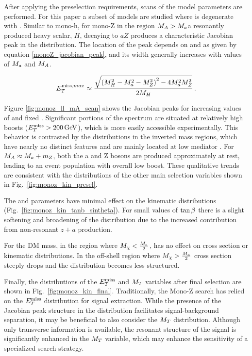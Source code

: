After applying the preselection requirements, scans of the model parameters are performed.  For this paper a subset of models are studied where \mA is degenerate with \mH.  Similar to mono-h, for mono-Z in the region $M_{A}>M_{a}$a resonantly produced heavy scalar, $H$, decaying to $aZ$ produces a characteristic Jacobian peak in the \MET distribution.  The location of the peak depends on \mH and \ma as given by equation \ref{monoZ_jacobian_peak}, and its width generally increases with values of  $M_{a}$ and $M_{A}$.  

\begin{align}
E^{\mathrm{miss},max}_T \approx \frac{\sqrt{\left(M_{H}^2 -M_{a}^2 -M_{Z}^2\right)^2 - 4 M_{a}^2 M_{Z}^2}}{2M_{H}}\,.
\label{eq:monoZ_jacobian_peak}
\end{align}

Figure \ref{fig:monoz_ll_mA_scan} shows the Jacobian peaks for increasing values of \mH and fixed \ma.  Significant portions of the spectrum are situated at relatively high boosts ($\MET>\unit[200]{GeV}$), which is more easily accessible experimentally.  This behavior is contrasted by the distributions in the inverted mass regions, which have nearly no distinct features and are mainly located at low mediator \pt. For $M_{A}\approx M_{a}+m_{Z}$, both the a and Z bosons are produced approximately at rest, leading to an event population with overall low boost. These qualitative trends are consistent with the distributions of the other main selection variables shown in Fig.~\ref{fig:monoz_kin_presel}.

The \tanb and \sinp parameters have minimal effect on the kinematic distributions (Fig.~\ref{fig:monoz_kin_tanb_sintheta}).  For small values of $\tan\beta$ there is a slight softening and broadening of the \MET distribution due to the increased contribution from non-resonant $z+a$ production.

For the DM mass, in the region where $M_{\chi} < \frac{M_{a}}{2}$, \mDM has no effect on cross section or kinematic distributions.  In the off-shell region where  $M_{\chi} > \frac{M_{a}}{2}$ cross section steeply drops and the \MET distribution becomes less structured.




Finally, the distributions of the $E_T^\mathrm{miss}$ and $M_{T}$ variables after final selection are shown in Fig.~\ref{fig:monoz_kin_final}. Traditionally, the Mono-Z search has relied on the $E_T^\mathrm{miss}$ distribution for signal extraction. While the presence of the Jacobian peak structure in the distribution facilitates signal-background separation, it may be beneficial to also consider the $M_{T}$ distribution. Although only transverse information is available, the resonant structure of the signal is significantly enhanced in the $M_{T}$ variable, which may enhance the sensitivity of a specialized search strategy.

